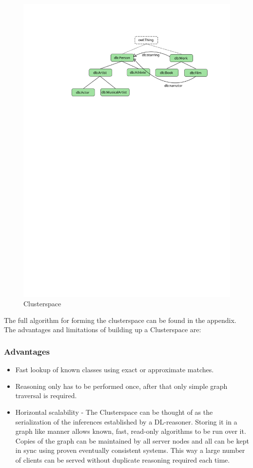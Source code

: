 \documentclass[journal]{IEEEtran}
\begin{document}
\begin{figure}[h]
    \centering
    \includegraphics[scale=0.6]{images/cs}
    \caption{Clusterspace}
    \label{fig:cs}
\end{figure}

The full algorithm for forming the clusterspace can be found in the appendix. %
The advantages and limitations of building up a Clusterspace are:

\subsubsection*{Advantages}
\begin{itemize}
    \item Fast lookup of known classes using exact or approximate matches.
    \item Reasoning only has to be performed once, after that only simple graph
        traversal is required.
    \item Horizontal scalability - The Clusterspace can be thought of as the
        serialization of the inferences established by a DL-reasoner. Storing
        it in a graph like manner allows known, fast, read-only algorithms to
        be run over it. Copies of the graph can be maintained by all server
        nodes and all can be kept in sync using proven eventually consistent
        systems. This way a large number of clients can be served without
        duplicate reasoning required each time.
\end{itemize}
\end{document}
